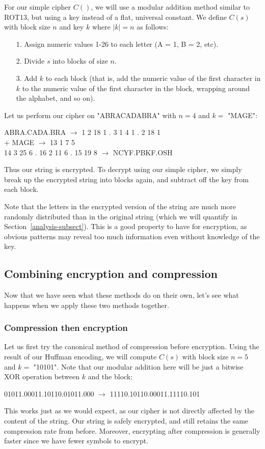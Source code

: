 \documentclass[11pt]{article}
\newcommand\genref{}
\newcommand\sectref{}
\def\genref#1#2{#1~\ref{#2}}
\def\sectref#1{\genref{Section}{#1}}
\begin{document}
For our simple cipher $C()$, we will use a modular addition method similar to ROT13, but using a key instead 
of a flat, universal constant. We define $C(s)$ with block size $n$ and key $k$ where $|k|=n$ as follows: 
\begin{itemize}
	\item[1.] Assign numeric values 1-26 to each letter (A = 1, B = 2, etc).
	\item[2.] Divide $s$ into blocks of size $n$.
	\item[3.] Add $k$ to each block (that is, add the numeric value of the first character in $k$ to the 
numeric value of the first character in the block, wrapping around the alphabet, and so on). 
\end{itemize}
Let us perform our cipher on "ABRACADABRA" with $n=4$ and $k=$ "MAGE":
\begin{center}
	ABRA.CADA.BRA $\rightarrow$ 1 2 18 1 . 3 1 4 1 . 2 18 1\\
	$+$ MAGE $\rightarrow$ 13 1 7 5\\
	14 3 25 6 . 16 2 11 6 . 15 19 8 $\rightarrow$ NCYF.PBKF.OSH\\
\end{center}
Thus our string is encrypted. To decrypt using our simple cipher, we simply break up the encrypted string into 
blocks again, and subtract off the key from each block.

Note that the letters in the encrypted version of the string are much more randomly distributed than in the 
original string (which we will quantify in \sectref{analysis-subsect}). This is a good property to have for encryption, 
as obvious patterns may reveal too much information even without knowledge of the key.

\subsection{Combining encryption and compression}\label{encrypt-plus-compress-subsect}
Now that we have seen what these methods do on their own, let's see what happens when we apply these two methods together. 

\subsubsection{Compression then encryption}\label{e-then-c-subsubsect}
Let us first try the canonical method of compression before encryption. Using the result of our Huffman encoding, we will compute 
$C(s)$ with block size $n=5$ and $k=$ "10101". Note that our modular addition here will be just a bitwise XOR operation between 
$k$ and the block:
\begin{center}
	01011.00011.10110.01011.000 $\rightarrow$ 11110.10110.00011.11110.101\\
\end{center}
This works just as we would expect, as our cipher is not directly affected by the content of the string. Our string is 
safely encrypted, and still retains the same compression rate from before. Moreover, encrypting after compression 
is generally faster since we have fewer symbols to encrypt. 
\end{document}
